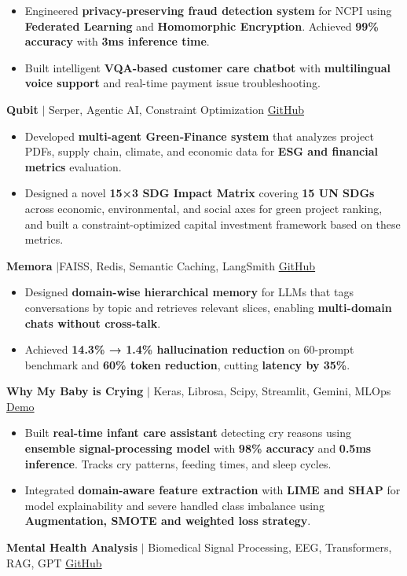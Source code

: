 \documentclass[a4paper,20pt]{article}
\newcommand{\resumeItem}[1]{
  \item\small{#1 \vspace{-2pt}}
}
\newcommand{\resumeItemListStart}{\begin{itemize}}
\newcommand{\resumeItemListEnd}{\end{itemize}\vspace{-5pt}}
\begin{document}
  \resumeItemListStart
    \resumeItem{Engineered \textbf{privacy-preserving fraud detection system} for NCPI  using \textbf{Federated Learning} and \textbf{Homomorphic Encryption}. Achieved \textbf{99\% accuracy} with \textbf{3ms inference time}.}
    \resumeItem{Built intelligent \textbf{VQA-based customer care chatbot} with \textbf{multilingual voice support} and real-time payment issue troubleshooting.}
  \resumeItemListEnd
\vspace{19pt}
\item
  \textbf{Qubit} $|$ Serper, Agentic AI, Constraint Optimization \hfill \href{https://github.com/Vishal-AS-0407/Qubit-GreenFinance}{GitHub}\\
  
  \resumeItemListStart
    \resumeItem{Developed \textbf{multi-agent Green‑Finance system} that analyzes project PDFs, supply chain, climate, and economic data for \textbf{ESG and financial metrics} evaluation.}    
\resumeItem{Designed a novel \textbf{15×3 SDG Impact Matrix} covering \textbf{15 UN SDGs} across economic, environmental, and social axes for green project ranking, and built a constraint-optimized capital investment framework based on these metrics.}


  \resumeItemListEnd

\item
  \textbf{Memora} $|$FAISS, Redis, Semantic Caching, LangSmith \hfill \href{https://github.com/Vishal-AS-0407/Memora}{GitHub} \\
  
  \resumeItemListStart
    \resumeItem{Designed \textbf{domain-wise hierarchical memory} for LLMs that tags conversations by topic and retrieves relevant slices, enabling \textbf{multi-domain chats without cross-talk}.}
    \resumeItem{Achieved \textbf{14.3\% → 1.4\% hallucination reduction} on 60-prompt benchmark and \textbf{60\% token reduction}, cutting \textbf{latency by 35\%}.}
  \resumeItemListEnd

\item
  \textbf{Why My Baby is Crying} $|$ Keras, Librosa, Scipy, Streamlit, Gemini, MLOps \hfill \href{https://babycrytesting.streamlit.app/}{Demo} \\

  \resumeItemListStart
    \resumeItem{Built \textbf{real-time infant care assistant} detecting cry reasons using \textbf{ensemble signal-processing model} with \textbf{98\% accuracy} and \textbf{0.5ms inference}. Tracks cry patterns, feeding times, and sleep cycles.}
    \resumeItem{Integrated \textbf{domain-aware feature extraction} with \textbf{LIME and SHAP} for model explainability and severe handled class imbalance using \textbf{Augmentation, SMOTE and weighted loss strategy}.}
  \resumeItemListEnd
\item
  \textbf{Mental Health Analysis} $|$ Biomedical Signal Processing, EEG, Transformers, RAG, GPT \hfill \href{https://github.com/Vishal-AS-0407/Patient-Mental-Health-Monitoring-Using-EEG.git}{GitHub} \\
 
\end{document}
